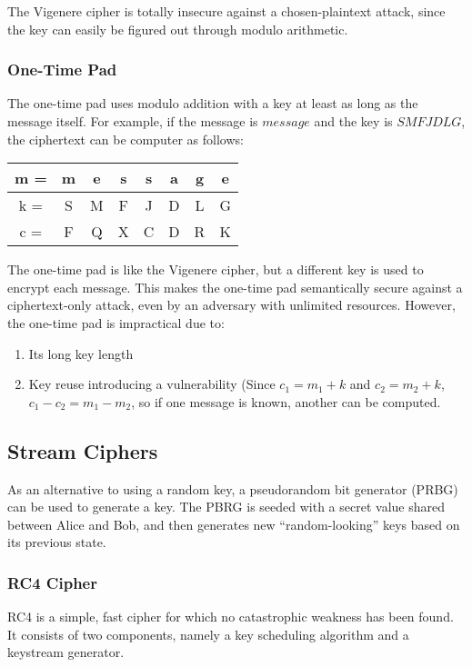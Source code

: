 \documentclass[12pt,titlepage]{article}
\begin{document}
        The Vigenere cipher is totally insecure against a chosen-plaintext attack, since the key can easily be figured out through modulo arithmetic.

      \subsubsection{One-Time Pad}
        The one-time pad uses modulo addition with a key at least as long as the message itself. For example, if the message is $message$
        and the key is $SMFJDLG$, the ciphertext can be computer as follows:

        \begin{table}[H]
          \centering
          \begin{tabular}{ | c | c c c c c c c | }
            \hline
            m = & m & e & s & s & a & g & e \\
            \hline
            k = & S & M & F & J & D & L & G \\
            \hline
            c = & F & Q & X & C & D & R & K \\
            \hline
          \end{tabular}
        \end{table}

        The one-time pad is like the Vigenere cipher, but a different key is used to encrypt each message. This makes the one-time pad semantically secure
        against a ciphertext-only attack, even by an adversary with unlimited resources. However, the one-time pad is impractical due to:
        \begin{enumerate}
          \item Its long key length
          \item Key reuse introducing a vulnerability (Since $c_1 = m_1 + k$ and $c_2 = m_2 + k$, $c_1 - c_2 = m_1 - m_2$, so if one message
            is known, another can be computed.
        \end{enumerate}

    \subsection{Stream Ciphers}
      As an alternative to using a random key, a pseudorandom bit generator (PRBG) can be used to generate a key. The PBRG is seeded with a
      secret value shared between Alice and Bob, and then generates new ``random-looking'' keys based on its previous state.

      \subsubsection{RC4 Cipher}
        RC4 is a simple, fast cipher for which no catastrophic weakness has been found. It consists of two components, namely a key scheduling algorithm
        and a keystream generator.
\end{document}
